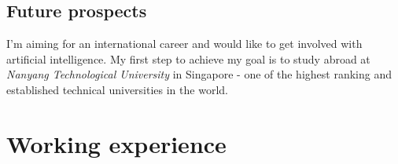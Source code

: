 \documentclass[letterpaper]{twentysecondcv} %
\begin{document}
\subsection{Future prospects}\vspace{-2mm}
I'm aiming for an international career and would like to get involved with artificial intelligence. My first step to achieve my goal is to study abroad at \textit{Nanyang Technological University} in Singapore - one of the highest ranking and established technical universities in the world. 

\vspace{1cm}
\section{Working experience}
\end{document}
